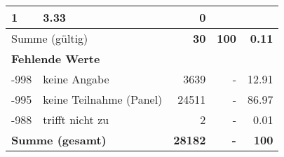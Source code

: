 \begin{longtable}{lXrrr}
       \num{1} &
       \num[round-mode=places,round-precision=2]{3,33} &
         \num[round-mode=places,round-precision=2]{0} \\
     \midrule
     \multicolumn{2}{l}{Summe (gültig)} &
       \textbf{\num{30}} &
     \textbf{100} &
       \textbf{\num[round-mode=places,round-precision=2]{0,11}} \\
     \multicolumn{5}{l}{\textbf{Fehlende Werte}}\\
       -998 &
       keine Angabe &
         \num{3639} &
        - &
         \num[round-mode=places,round-precision=2]{12,91} \\
       -995 &
       keine Teilnahme (Panel) &
         \num{24511} &
        - &
         \num[round-mode=places,round-precision=2]{86,97} \\
       -988 &
       trifft nicht zu &
         \num{2} &
        - &
         \num[round-mode=places,round-precision=2]{0,01} \\
     \midrule
     \multicolumn{2}{l}{\textbf{Summe (gesamt)}} &
          \textbf{\num{28182}} &
        \textbf{-} &
        \textbf{100} \\
     \bottomrule
     \end{longtable}
     

